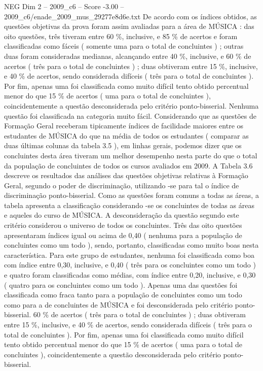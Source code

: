 \begin{textsample}{NEG Dim 2 – 2009\_c6 – Score -3.00 – 2009\_c6/enade\_2009\_mus\_29277e8d6e.txt}
De acordo com os índices obtidos, as questões objetivas da prova foram assim avaliadas para a área de MÚSICA : das oito questões, três tiveram entre 60 \%, inclusive, e 85 \% de acertos e foram classificadas como fáceis ( somente uma para o total de concluintes ) ; outras duas foram consideradas medianas, alcançando entre 40 \%, inclusive, e 60 \% de acertos ( três para o total de concluintes ) ; duas obtiveram entre 15 \%, inclusive, e 40 \% de acertos, sendo considerada difíceis ( três para o total de concluintes ).
Por fim, apenas uma foi classificada como muito difícil tento obtido percentual menor do que 15 \% de acertos ( uma para o total de concluintes ), coincidentemente a questão desconsiderada pelo critério ponto-bisserial.
Nenhuma questão foi classificada na categoria muito fácil.
Considerando que as questões de Formação Geral receberam tipicamente índices de facilidade maiores entre os estudantes de MÚSICA do que na média de todos os estudantes ( comparar as duas últimas colunas da tabela 3.5 ), em linhas gerais, podemos dizer que os concluintes desta área tiveram um melhor desempenho nesta parte do que o total da população de concluintes de todos os cursos avaliados em 2009.
A Tabela 3.6 descreve os resultados das análises das questões objetivas relativas à Formação Geral, segundo o poder de discriminação, utilizando -se para tal o índice de discriminação ponto-bisserial.
Como as questões foram comuns a todas as áreas, a tabela apresenta a classificação considerando -se os concluintes de todas as áreas e aqueles do curso de MÚSICA.
A desconsideração da questão segundo este critério considerou o universo de todos os concluintes.
Três das oito questões apresentaram índices igual ou acima de 0,40 ( nenhuma para a população de concluintes como um todo ), sendo, portanto, classificadas como muito boas nesta característica.
Para este grupo de estudantes, nenhuma foi classificada como boa com índice entre 0,30, inclusive, e 0,40 ( três para os concluintes como um todo ) e quatro foram classificadas como médias, com índice entre 0,20, inclusive, e 0,30 ( quatro para os concluintes como um todo ).
Apenas uma das questões foi classificada como fraca tanto para a população de concluintes como um todo como para a de concluintes de MÚSICA e foi desconsiderada pelo critério ponto-bisserial. 60 \% de acertos ( três para o total de concluintes ) ; duas obtiveram entre 15 \%, inclusive, e 40 \% de acertos, sendo considerada difíceis ( três para o total de concluintes ).
Por fim, apenas uma foi classificada como muito difícil tento obtido percentual menor do que 15 \% de acertos ( uma para o total de concluintes ), coincidentemente a questão desconsiderada pelo critério ponto-bisserial.

\end{textsample}
